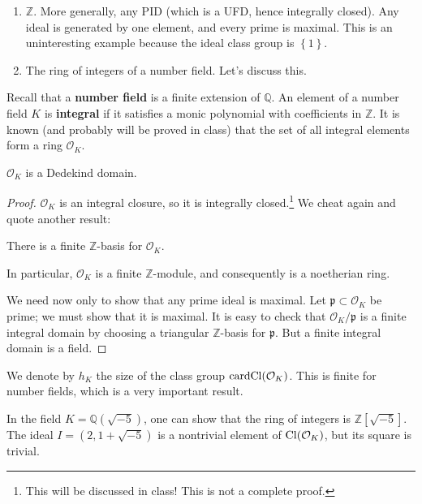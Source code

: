 \begin{example} 
\begin{enumerate}
\item $\mathbb{Z}$.  More generally, any PID (which is a UFD, hence
integrally closed).  Any ideal is generated by one element, and every prime is
maximal. This is an uninteresting example because the ideal class group is
$\left\{1\right\}$.
\item The ring of integers of a number field.  Let's discuss this.
\end{enumerate}

Recall that a \textbf{number field} is a finite extension of $\mathbb{Q}$.   An
element of a number field $K$ is \textbf{integral} if it satisfies a monic
polynomial with coefficients in $\mathbb{Z}$.  It is known (and probably will
be proved in class) that the set of all
integral elements form a ring $\mathcal{O}_K$.  

\begin{proposition} 
$\mathcal{O}_K$ is a Dedekind domain. 
\end{proposition} 
\begin{proof} 
$\mathcal{O}_K$ is an integral closure, so it is integrally
closed.\footnote{This will be discussed in class! This is not a complete proof.} 
We cheat again and quote another result:

\begin{lemma} 
There is a finite $\mathbb{Z}$-basis for $\mathcal{O}_K$.
\end{lemma} 
In particular, $\mathcal{O}_K$ is a finite $\mathbb{Z}$-module, and
consequently is a noetherian ring.  

We need now only to show that  any prime ideal is maximal.  Let $\mathfrak{p}
\subset \mathcal{O}_K$ be prime; we must show that it is maximal. It is easy to
check that $\mathcal{O}_K/\mathfrak{p}$ is a  finite integral domain by
choosing a triangular $\mathbb{Z}$-basis for $\mathfrak{p}$. But a finite
integral domain is a field.  
\end{proof} 
\newcommand{\card}{\mathrm{card}}
We denote by $h_K$ the size of the class group $\card  \cl(\mathcal{O}_K)$.
This is finite for number fields, which is a very important result.  

\begin{exercise} 
In the field $K = \mathbb{Q}(\sqrt{-5})$, one can show that the ring of
integers is $\mathbb{Z}[\sqrt{-5}]$.  The ideal $I = (2, 1+\sqrt{-5})$ is a
nontrivial element of $\mathrm{Cl}(\mathcal{O}_K)$, but its square is trivial.  


\end{exercise}
\end{example}
